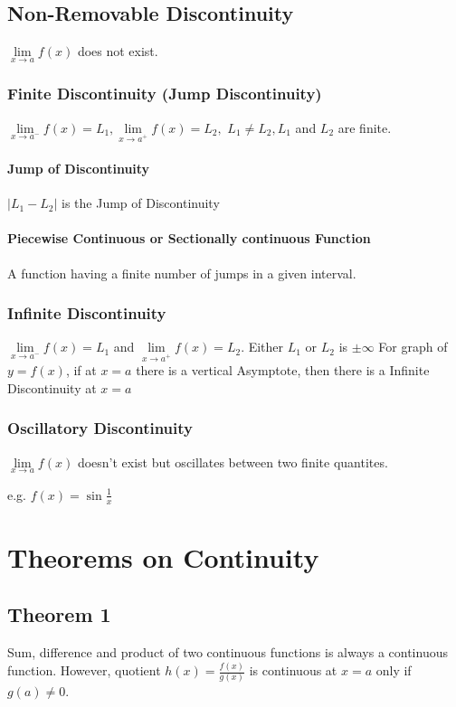 \documentclass{article}
\begin{document}
\subsection{Non-Removable Discontinuity}
$\lim\limits_{x \to a}{f(x)}$ does not exist.

\subsubsection{Finite Discontinuity (Jump Discontinuity)}
$\lim\limits_{x \to a^-}{f(x)}=L_{1}, \lim\limits_{x \to a^+}{f(x)}=L_{2},$ 
$L_{1} \not= L_{2}, L_{1}$ and $L_{2}$ are finite.
\paragraph{Jump of Discontinuity}
$|L_{1}-L_{2}|$ is the Jump of Discontinuity

\paragraph{Piecewise Continuous or Sectionally continuous Function}
A function having a finite number of jumps in a given interval.

\subsubsection{Infinite Discontinuity}
$\lim\limits_{x \to a^-}{f(x)}=L_{1}$ and $\lim\limits_{x \to a^+}{f(x)}=L_{2}$. Either $L_{1}$ or $L_{2}$ is $\pm \infty$
\newline \newline
For graph of $y=f(x)$, if at $x=a$ there is a vertical Asymptote, then there is a Infinite Discontinuity at $x=a$

\subsubsection{Oscillatory Discontinuity}
$\lim\limits_{x \to a}{f(x)}$ doesn't exist but oscillates between two finite quantites.

e.g. $f(x)=\sin \frac{1}{x}$

\section{Theorems on Continuity}
\subsection{Theorem 1}
Sum, difference and product of two continuous functions is always a continuous function. \newline 
However, quotient $h(x)=\frac{f(x)}{g(x)}$ is continuous at $x=a$ only if $g(a) \not= 0$.
\end{document}
